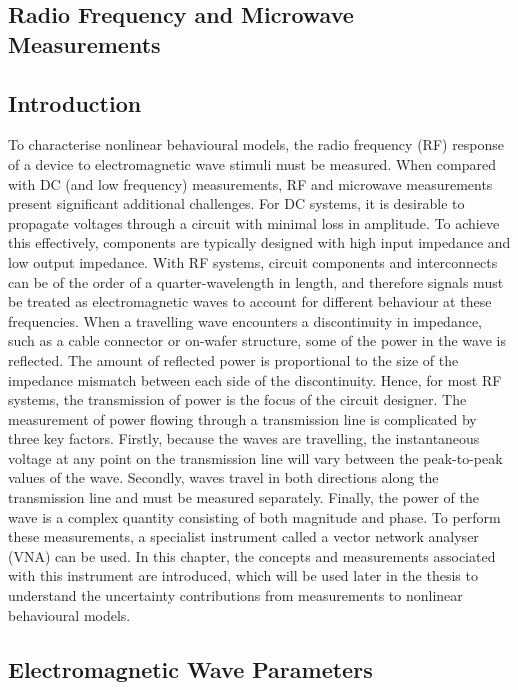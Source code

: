 \documentclass[../thesis/thesis.tex]{subfiles}
\begin{document}
\begin{refsection}
\setcounter{chapter}{1}
\chapter{Radio Frequency and Microwave \\Measurements}
\section{Introduction}

To characterise nonlinear behavioural models, the radio frequency (RF) response of a device to electromagnetic wave stimuli must be measured. When compared with DC (and low frequency) measurements, RF and microwave measurements present significant additional challenges. 
For DC systems, it is desirable to propagate voltages through a circuit with minimal loss in amplitude. To achieve this effectively, components are typically designed with high input impedance and low output impedance. With RF systems, circuit components and interconnects can be of the order of a quarter-wavelength in length, and therefore signals must be treated as electromagnetic waves to account for different behaviour at these frequencies.
When a travelling wave encounters a discontinuity in impedance, such as a cable connector or on-wafer structure, some of the power in the wave is reflected. The amount of reflected power is proportional to the size of the impedance mismatch between each side of the discontinuity. Hence, for most RF systems, the transmission of power is the focus of the circuit designer. The measurement of power flowing through a transmission line is complicated by three key factors. Firstly, because the waves are travelling, the instantaneous voltage at any point on the transmission line will vary between the peak-to-peak values of the wave. Secondly, waves travel in both directions along the transmission line and must be measured separately. Finally, the power of the wave is a complex quantity consisting of both magnitude and phase.
To perform these measurements, a specialist instrument called a vector network analyser (VNA) can be used. In this chapter, the concepts and measurements associated with this instrument are introduced, which will be used later in the thesis to understand the uncertainty contributions from measurements to nonlinear behavioural models.

\section{Electromagnetic Wave Parameters}

\end{refsection}
\end{document}
